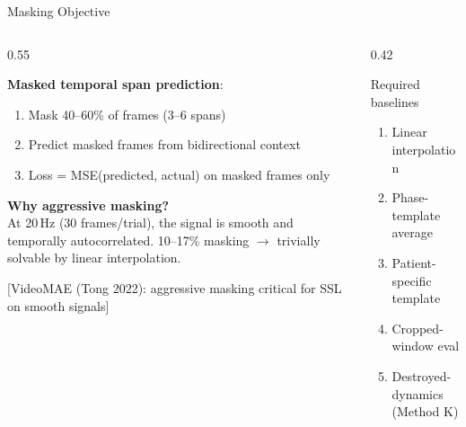 \documentclass[aspectratio=169, 11pt]{beamer}
\newcommand{\emphcite}[1]{\textcolor{DukeBlue!70}{\footnotesize [#1]}}
\begin{document}
\begin{frame}{Masking Objective}

\begin{columns}[T]
\begin{column}{0.55\textwidth}

\textbf{Masked temporal span prediction}:
\begin{enumerate}
  \item Mask 40--60\% of frames (3--6 spans)
  \item Predict masked frames from bidirectional context
  \item Loss = MSE(predicted, actual) on masked frames only
\end{enumerate}

\vspace{0.4em}
\textbf{Why aggressive masking?}\\
{\small At 20\,Hz (30 frames/trial), the signal is smooth and temporally autocorrelated. 10--17\% masking $\to$ trivially solvable by linear interpolation.}

\vspace{0.4em}
\emphcite{VideoMAE (Tong 2022): aggressive masking critical for SSL on smooth signals}

\end{column}
\begin{column}{0.42\textwidth}


\vspace{0.6em}
\begin{block}{\small Required baselines}
\scriptsize
\begin{enumerate}
  \item Linear interpolation
  \item Phase-template average
  \item Patient-specific template
  \item Cropped-window eval
  \item Destroyed-dynamics (Method K)
\end{enumerate}
\end{block}
\end{column}
\end{columns}
\end{frame}
\end{document}
